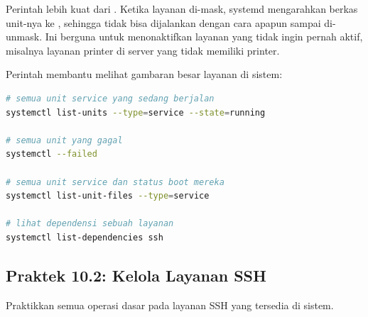 Perintah  lebih kuat dari . Ketika layanan di-mask, systemd mengarahkan berkas unit-nya ke , sehingga tidak bisa dijalankan dengan cara apapun sampai di-unmask. Ini berguna untuk menonaktifkan layanan yang tidak ingin pernah aktif, misalnya layanan printer di server yang tidak memiliki printer.

Perintah  membantu melihat gambaran besar layanan di sistem:

\begin{lstlisting}[language=bash, caption={Melihat dan memfilter daftar unit}]
# semua unit service yang sedang berjalan
systemctl list-units --type=service --state=running

# semua unit yang gagal
systemctl --failed

# semua unit service dan status boot mereka
systemctl list-unit-files --type=service

# lihat dependensi sebuah layanan
systemctl list-dependencies ssh
\end{lstlisting}

\subsection*{Praktek 10.2: Kelola Layanan SSH}

Praktikkan semua operasi dasar  pada layanan SSH yang tersedia di sistem.

